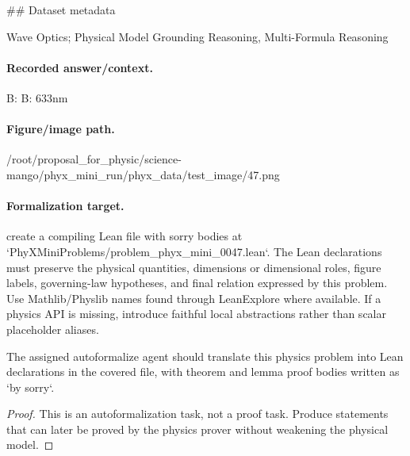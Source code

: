 \#\# Dataset metadata

Wave Optics; Physical Model Grounding Reasoning, Multi-Formula Reasoning

\paragraph{Recorded answer/context.}
B: B: 633nm

\paragraph{Figure/image path.}
/root/proposal\_for\_physic/science-mango/phyx\_mini\_run/phyx\_data/test\_image/47.png

\paragraph{Formalization target.}
create a compiling Lean file with sorry bodies at `PhyXMiniProblems/problem\_phyx\_mini\_0047.lean`. The Lean declarations must preserve the physical quantities, dimensions or dimensional roles, figure labels, governing-law hypotheses, and final relation expressed by this problem.
Use Mathlib/Physlib names found through LeanExplore where available. If a physics API is missing, introduce faithful local abstractions rather than scalar placeholder aliases.

\begin{theorem}
\label{thm:physics:phyx_mini_0047:target}
The assigned autoformalize agent should translate this physics problem into Lean declarations in the covered file, with theorem and lemma proof bodies written as `by sorry`.
\end{theorem}
\begin{proof}
This is an autoformalization task, not a proof task. Produce statements that can later be proved by the physics prover without weakening the physical model.
\end{proof}


